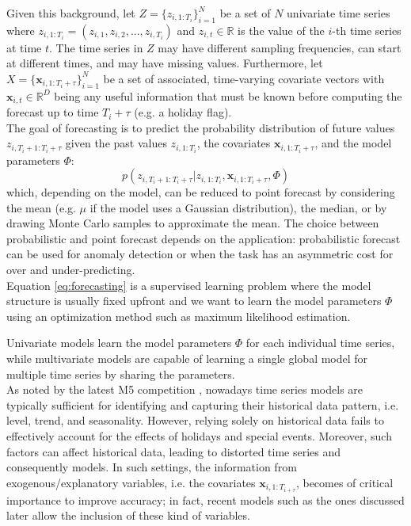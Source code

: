 \documentclass[a4paper]{article} %
\begin{document}
	Given this background, let $Z=\{ z_{i, 1:T_i} \}_{i=1}^{N}$ be a  set of $N$ univariate time series where $z_{i, 1:T_i} = (z_{i,1}, z_{i,2}, ..., z_{i,T_i})$ and $z_{i,t} \in \mathbb{R}$ is the value of the $i$-th time series at time $t$. The time series in $Z$ may have different sampling frequencies, can start at different times, and may have missing values. Furthermore, let $X=\{\pmb{x}_{i, 1:T_i+\tau} \}_{i=1}^{N}$ be a set of associated, time-varying covariate vectors with $\pmb{x}_{i,t} \in \mathbb{R}^D$ being any useful information that must be known before computing the forecast up to time $T_i + \tau$ (e.g. a holiday flag).\\
	The goal of forecasting \cite{ForecastingHyndmanAthanasopoulos} is to predict the probability distribution of future values $z_{i,T_{i}+1:T_i+\tau}$ given the past values $z_{i, 1:T_i}$, the covariates $\pmb{x}_{i, 1:T_i + \tau}$, and the model parameters $\Phi$:
	\begin{equation} \label{eq:forecasting}
		p(z_{i,T_{i}+1:T_i+\tau} | z_{i, 1:T_i}, \pmb{x}_{i, 1:T_i + \tau}, \Phi)
	\end{equation}
	which, depending on the model, can be reduced to point forecast by considering the mean (e.g. $\mu$ if the model uses a Gaussian distribution), the median, or by drawing Monte Carlo samples to approximate the mean. The choice between probabilistic and point forecast depends on the application: probabilistic forecast can be used for anomaly detection or when the task has an asymmetric cost for over and under-predicting. \\
	Equation \ref{eq:forecasting} is a supervised learning problem where the model structure is usually fixed upfront and we want to learn the model parameters $\Phi$ using an optimization method such as maximum likelihood estimation.
	
	Univariate models learn the model parameters $\Phi$ for each individual time series, while multivariate models are capable of learning a single global model for multiple time series by sharing the parameters.\\
	As noted by the latest M5 competition \cite{M5Competition}, nowadays time series models are typically sufficient for identifying and capturing their historical data pattern, i.e. level, trend, and seasonality. However, relying solely on historical data fails to effectively account for the effects of holidays and special events. Moreover, such factors can affect historical data, leading to distorted time series and consequently models. In such settings, the information from exogenous/explanatory variables, i.e.  the covariates $\pmb{x}_{i, 1:T_{i+\tau}}$, becomes of critical importance to improve accuracy; in fact, recent models such as the ones discussed later \cite{FacebookProphet, DeepAR, DeepState} allow the inclusion of these kind of variables.
	
\end{document}
